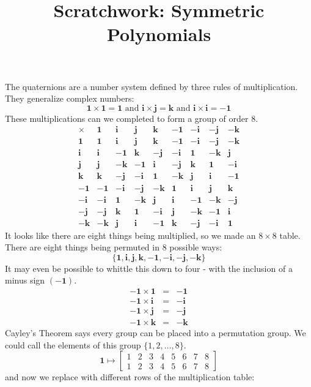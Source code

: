 \documentclass[12pt]{article}
\title{Scratchwork: Symmetric Polynomials}
\date{}
\newcommand{\one}{\mathbf{1}}
\newcommand{\ii}{\mathbf{i}}
\newcommand{\jj}{\mathbf{j}}
\newcommand{\kk}{\mathbf{k}}
\begin{document}
\sffamily

\maketitle

\noindent The quaternions are a number system defined by three rules of multiplication.  They generalize complex numbers:
$$ \one \times \one = \one \text{ and } \ii \times \jj = \kk \text{ and } \ii \times \ii = -\one $$
These multiplications can we completed to form a group of order $8$.
$$
\begin{array}{r||rr|rr||rr|rr}
 \times & \one & \ii & \jj & \kk & -\one & -\ii & -\jj & -\kk \\ \hline
\one  & \one & \ii & \jj & \kk & -\one & -\ii & -\jj & -\kk \\
\ii & \ii & -\one & \kk & -\jj & -\ii & \one & -\kk & \jj \\ \hline 
\jj & \jj & - \kk & -\one & \ii & - \jj & \kk & \one & -\ii  \\
\kk & \kk & -\jj & -\ii & \one & -\kk & \jj & \ii & -\one \\ \hline \hline
-\one & -\one & -\ii & -\jj & -\kk & \one & \ii & \jj & \kk\\
-\ii & -\ii & \one & -\kk & \jj & \ii & -\one & -\kk & -\jj\\ \hline
-\jj & -\jj &  \kk & \one & -\ii &  \jj & -\kk & -\one & \ii  \\
-\kk & -\kk & \jj & \ii & -\one & \kk & -\jj & -\ii & \one
\end{array}
 $$
It looks like there are eight things being multiplied, so we made an $8 \times 8$ table.  There are eight things being permuted in 8 possible ways:
$$ \{ \one , \ii , \jj, \kk, -\one, -\ii, -\jj, -\kk \} $$
It may even be possible to whittle this down to four - with the inclusion of a minus sign $(-\one)$.  
\begin{eqnarray*}
-\one \times \one &=& -\one \\
-\one \times \ii  &=& -\ii \\
-\one \times \jj  &=& -\jj \\
-\one \times \kk  &=& -\kk
\end{eqnarray*}
Cayley's Theorem says every group can be placed into a permutation group.  We could call the elements of this group $\{1, 2, \dots, 8\}$. 
$$
\one \mapsto \left[\begin{array}{cccccccc} 1 & 2 & 3 & 4 & 5 & 6 & 7 & 8 \\
 1 & 2 & 3 & 4 & 5 & 6 & 7 & 8  \end{array} \right]
 $$
 and now we replace with different rows of the multiplication table:
 
\end{document}
